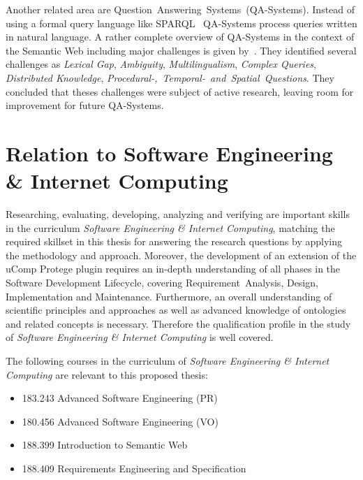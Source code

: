 \documentclass[12pt, notitlepage]{article}
\begin{document}
Another related area are Question~Answering~Systems~(QA-Systems). Instead of using a formal query language like SPARQL~\cite{harris2013sparql} QA-Systems process queries written in natural language. A rather complete overview of QA-Systems in the context of the Semantic Web including major challenges is given by~\citet{hoffner2016survey}. They identified several challenges as \emph{Lexical Gap}, \emph{Ambiguity}, \emph{Multilingualism}, \emph{Complex Queries}, \emph{Distributed Knowledge}, \emph{Procedural-,~Temporal-~and~Spatial~Questions}. They concluded that theses challenges were subject of active research, leaving room for improvement for future QA-Systems. 

\section{Relation to Software Engineering \& Internet Computing}
Researching, evaluating, developing, analyzing and verifying are important skills in the curriculum \emph{Software Engineering \& Internet Computing}, matching the required skillset in this thesis for answering the research questions by applying the methodology and approach. Moreover, the development of an extension of the uComp Protege plugin requires an in-depth understanding of all phases in the Software Development Lifecycle, covering Requirement~Analysis, Design, Implementation and Maintenance. Furthermore, an overall understanding of scientific principles and approaches as well as advanced knowledge of ontologies and related concepts is necessary. Therefore the qualification profile in the study of \emph{Software Engineering \& Internet Computing} is well covered. 

The following courses in the curriculum of \emph{Software Engineering \& Internet Computing} are relevant to this proposed thesis:
\begin{itemize}
	\item 183.243 Advanced Software Engineering (PR)
	\item 180.456 Advanced Software Engineering (VO)
	\item 188.399 Introduction to Semantic Web
	\item 188.409 Requirements Engineering and Specification
\end{itemize}

\newpage


\end{document}
